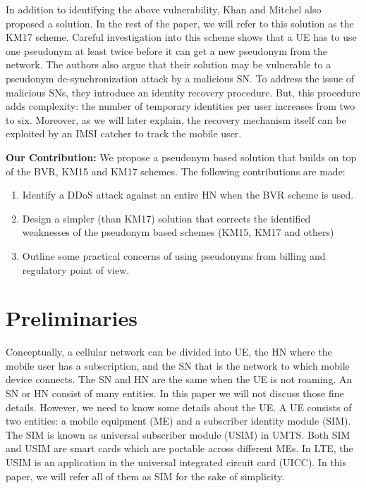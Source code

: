 \documentclass{llncs} %
\begin{document}
In addition to identifying the above vulnerability, Khan and Mitchel \cite{wisec17} also proposed a solution. In the rest of the paper, we will refer to this solution as the KM17 scheme. Careful investigation into this scheme shows that a UE has to use one pseudonym at least twice before it can get a new pseudonym from the network. The authors also argue that their solution may be vulnerable to a pseudonym de-synchronization attack by a malicious SN. To address the issue of malicious SNs, they introduce an identity recovery procedure. But, this procedure adds complexity: the number of temporary identities per user increases from two to six. Moreover, as we will later explain, the recovery mechanism itself can be exploited by an IMSI catcher to track the mobile user.


\textbf{Our Contribution:}
We propose a pseudonym based solution that builds on top of the BVR, KM15 and KM17 schemes. The following contributions are made:
\begin{enumerate}
\item Identify a DDoS attack against an entire HN when the BVR scheme is used.
\item Design a simpler (than KM17) solution that corrects the identified weaknesses of the pseudonym based schemes (KM15, KM17 and others)
\item Outline some practical concerns of using pseudonyms from billing and regulatory point of view.
\end{enumerate}


\section{Preliminaries}
Conceptually, a cellular network can be divided into UE, the HN where the mobile user has a subscription, and the SN that is the network to which mobile device connects.  The SN and HN are the same when the UE is not roaming. An SN or HN consist of many entities. In this paper we will not discuss those fine details. However, we need to know some details about the UE. A UE consists of two entities: a mobile equipment (ME) and a subscriber identity module (SIM). The SIM is known as universal subscriber module (USIM) in UMTS. Both SIM and USIM are smart cards which are portable across different MEs. In LTE, the USIM is an application in the universal integrated circuit card (UICC). In this paper, we will refer all of them as SIM for the sake of simplicity.
\end{document}
